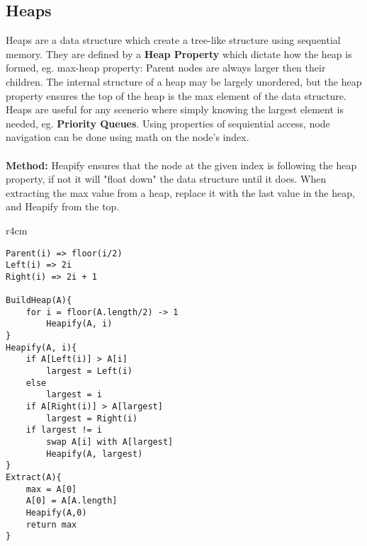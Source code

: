\documentclass{article}
\begin{document}
\subsection{Heaps}
Heaps are a data structure which create a tree-like structure using sequential memory. They are defined by a {\bf Heap Property} which dictate how the heap is formed, eg. max-heap property: Parent nodes are always larger then their children. The internal structure of a heap may be largely unordered, but the heap property ensures the top of the heap is the max element of the data structure. Heaps are useful for any scenerio where simply knowing the largest element is needed, eg. {\bf Priority Queues}. Using properties of sequiential access, node navigation can be done using math on the node's index.
\\ \\
{\bf Method:} Heapify ensures that the node at the given index is following the heap property, if not it will "float down" the data structure until it does. When extracting the max value from a heap, replace it with the last value in the heap, and Heapify from the top.

\begin{wrapfigure}{r}{4cm}
\end{wrapfigure}

\begin{lstlisting}[style=pseudo]
Parent(i) => floor(i/2)
Left(i) => 2i
Right(i) => 2i + 1

BuildHeap(A){
	for i = floor(A.length/2) -> 1
		Heapify(A, i)
}
Heapify(A, i){
	if A[Left(i)] > A[i]
		largest = Left(i)
	else
		largest = i
	if A[Right(i)] > A[largest]
		largest = Right(i)
	if largest != i
		swap A[i] with A[largest]
		Heapify(A, largest)
}
Extract(A){
	max = A[0]
	A[0] = A[A.length]
	Heapify(A,0)
	return max
}
\end{lstlisting}


\end{document}
